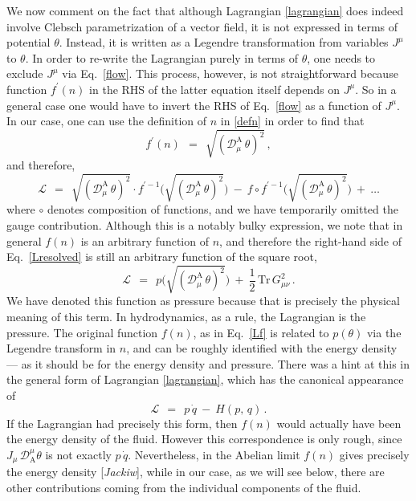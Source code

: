 \documentclass[epsfig,12pt]{article}
\def\beq{\begin{equation}}
\def\eeq{\end{equation}}
\newcommand{\md}{\mathcal{D}}
\newcommand{\ml}{\mathcal{L}}
\newcommand{\Tr}{\text{Tr}}
\begin{document}
	We now comment on the fact that although Lagrangian \eqref{lagrangian} does indeed involve Clebsch parametrization
	of a vector field, it is not expressed in terms of potential $ \theta $.
	Instead, it is written as a Legendre transformation from variables $ J^\mu $ to $ \theta $.
	In order to re-write the Lagrangian purely in terms of $ \theta $, one needs to exclude $ J^\mu $ via
	Eq.~\eqref{flow}.
	This process, however, is not straightforward because function $ f^\prime(n) $ in the RHS of the latter equation
	itself depends on $ J^\mu $.
	So in a general case one would have to invert the RHS of Eq.~\eqref{flow} as a function of $ J^\mu $.
	In our case, one can use the definition of $ n $ in \eqref{defn} in order to find that
\beq
	f^\prime(n)    ~~=~~    \sqrt{ (\md^\text{A}_\mu\, \theta)^2 }\,,
\eeq
	and therefore,
\beq
\label{Lresolved}
	\ml    ~~=~~    \sqrt{ (\md^\text{A}_\mu\, \theta)^2 } \cdot 
			f^{\prime -1}\Big(\sqrt{ (\md^\text{A}_\mu\, \theta)^2 }\Big)  ~-~
			f \circ f^{\prime -1}\Big(\sqrt{ (\md^\text{A}_\mu\, \theta)^2 }\Big)  ~+~
			\dots
\eeq
	where $ \circ $ denotes composition of functions, and we have temporarily omitted the gauge contribution.
	Although this is a notably bulky expression, we note that in general $ f(n) $ is an arbitrary
	function of $ n $,
	and therefore the right-hand side of Eq.~\eqref{Lresolved} is still an arbitrary function of
	the square root,
\beq
\label{Lp}
	\ml    ~~=~~    p\Big(\sqrt{(\md^\text{A}_\mu\, \theta)^2}\Big)  ~+~ \frac{1}{2}\, \Tr\, G_{\mu\nu}^2\,.
\eeq
	We have denoted this function as pressure because that is precisely the physical meaning of this term.
	In hydrodynamics, as a rule, the Lagrangian is the pressure.
	The original function $ f(n) $, as in Eq.~\eqref{Lf} is related to $ p(\theta) $ via the Legendre transform in $ n $,
	and can be roughly identified with the energy density --- as it should be for the energy density and pressure.
	There was a hint at this in the general form of Lagrangian \eqref{lagrangian}, which has the canonical appearance of
\beq
	\ml    ~~=~~    p\, \dot{q}  ~-~    H(p,\,q)\,.
\eeq
	If the Lagrangian had precisely this form, then $ f(n) $ would actually have been the energy density of the fluid.
	However this correspondence is only rough, since $ J_\mu\, \md_\text{A}^\mu \theta $ is not exactly $ p\,\dot q $.
	Nevertheless, in the Abelian limit $ f(n) $ gives precisely the energy density [{\it Jackiw}], while
	in our case, as we will see below, there are other contributions coming from the individual components of the fluid.
\end{document}

